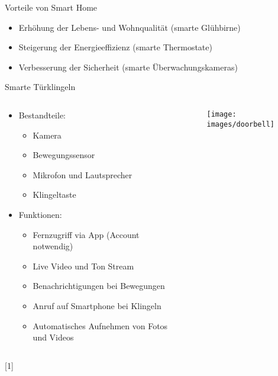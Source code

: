 \documentclass[11pt, aspectratio=169, modernfonts]{beamer}
\begin{document}
    \begin{frame}{Vorteile von Smart Home}
        \begin{itemize}
            \item Erhöhung der Lebens- und Wohnqualität (smarte Glühbirne)\\[.4cm]
            \item Steigerung der Energieeffizienz (smarte Thermostate)\\[.4cm]
            \item Verbesserung der Sicherheit (smarte Überwachungskameras)\\[.4cm]
        \end{itemize}
    \end{frame}

    \begin{frame}{Smarte Türklingeln}
        \begin{columns}
            \begin{column}{0.6\textwidth}
                \begin{itemize}
                    \item Bestandteile:
                    \begin{itemize}
                        \item Kamera
                        \item Bewegungssensor
                        \item Mikrofon und Lautsprecher
                        \item Klingeltaste
                    \end{itemize}
                    \vspace{0.2cm}
                    \item Funktionen:
                    \begin{itemize}
                        \item Fernzugriff via App (Account notwendig)
                        \item Live Video und Ton Stream
                        \item Benachrichtigungen bei Bewegungen
                        \item Anruf auf Smartphone bei Klingeln
                        \item Automatisches Aufnehmen von Fotos und Videos
                    \end{itemize}
                \end{itemize}
            \end{column}

            \begin{column}{0.4\textwidth}
                \begin{figure}
                    \centering
                    \texttt{[image: images/doorbell]}\label{fig:doorbell}
                \end{figure}
            \end{column}
        \end{columns}
        \hfill [1]
    \end{frame}
\end{document}
